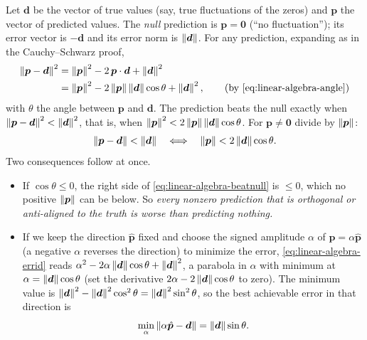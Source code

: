 Let $\bm d$ be the vector of true values (say, true fluctuations of the zeros) and $\bm p$ the vector of predicted values. The \emph{null} prediction is $\bm p=\bm 0$ (``no fluctuation''); its error vector is $-\bm d$ and its error norm is $\left\lVert \bm d\right\rVert$. For any prediction, expanding as in the Cauchy--Schwarz proof,
\begin{align}
\norm{\bm p-\bm d}^2&=\norm{\bm p}^2-2\,\bm p\cdot\bm d+\norm{\bm d}^2 \label{eq:linear-algebra-errid}\\
&=\norm{\bm p}^2-2\norm{\bm p}\norm{\bm d}\cos\theta+\norm{\bm d}^2,\qquad\text{(by \cref{eq:linear-algebra-angle})}\nonumber
\end{align}
with $\theta$ the angle between $\bm p$ and $\bm d$. The prediction beats the null exactly when $\left\lVert \bm p-\bm d\right\rVert^2<\left\lVert \bm d\right\rVert^2$, that is, when $\left\lVert \bm p\right\rVert^2<2\left\lVert \bm p\right\rVert\left\lVert \bm d\right\rVert\cos\theta$. For $\bm p\neq\bm 0$ divide by $\left\lVert \bm p\right\rVert$:
\begin{equation}
\left\lVert \bm p-\bm d\right\rVert<\left\lVert \bm d\right\rVert\quad\Longleftrightarrow\quad\left\lVert \bm p\right\rVert<2\left\lVert \bm d\right\rVert\cos\theta .
\label{eq:linear-algebra-beatnull}
\end{equation}
Two consequences follow at once.
\begin{itemize}
\item If $\cos\theta\le0$, the right side of \cref{eq:linear-algebra-beatnull} is $\le0$, which no positive $\left\lVert \bm p\right\rVert$ can be below. So \emph{every nonzero prediction that is orthogonal or anti-aligned to the truth is worse than predicting nothing.}
\item If we keep the direction $\hat{\bm p}$ fixed and choose the signed amplitude $\alpha$ of $\bm p=\alpha\hat{\bm p}$ (a negative $\alpha$ reverses the direction) to minimize the error, \cref{eq:linear-algebra-errid} reads $\alpha^2-2\alpha\left\lVert \bm d\right\rVert\cos\theta+\left\lVert \bm d\right\rVert^2$, a parabola in $\alpha$ with minimum at $\alpha=\left\lVert \bm d\right\rVert\cos\theta$ (set the derivative $2\alpha-2\left\lVert \bm d\right\rVert\cos\theta$ to zero). The minimum value is $\left\lVert \bm d\right\rVert^2-\left\lVert \bm d\right\rVert^2\cos^2\theta=\left\lVert \bm d\right\rVert^2\sin^2\theta$, so the best achievable error in that direction is
\begin{equation}
\min_\alpha\left\lVert \alpha\hat{\bm p}-\bm d\right\rVert=\left\lVert \bm d\right\rVert\sin\theta .
\label{eq:linear-algebra-sintheta}
\end{equation}
\end{itemize}

